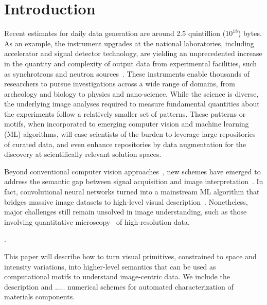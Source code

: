\section{Introduction}
Recent estimates for daily data generation are around 2.5 quintillion ($10^{18}$) bytes. As an example, the instrument upgrades at the national laboratories, including accelerator and signal detector technology, are yielding an unprecedented increase in the quantity and complexity of output data from experimental facilities, such as synchrotrons and neutron sources~\cite{EOD:2015}. These instruments enable thousands of researchers to pursue investigations across a wide range of domains, from archeology and biology to physics and nano-science. While the science is diverse, the underlying image analyses required to measure fundamental quantities about the experiments follow a relatively smaller set of patterns. These patterns or motifs, when incorporated to emerging computer vision and machine learning (ML) algorithms, will ease scientists of the burden to leverage large repositories of curated data, and even enhance repositories by data augmentation for the discovery at scientifically relevant solution spaces.

Beyond conventional computer vision approaches~\cite{Ballard, Gonzalez, AFM:2015}, new schemes have emerged to address the semantic gap between signal acquisition and image interpretation~\cite{Zhang:2016:a}. In fact, convolutional neural networks turned into a mainstream ML algorithm that bridges massive image datasets to high-level visual description~\cite{Fei:2009, Fei:2015}. Nonetheless, major challenges still remain unsolved in image understanding, such as those involving quantitative microscopy~\cite{Ushizima2016} of high-resolution data.

.

This paper will describe how to turn visual primitives, constrained to space and intensity variations, into higher-level semantics that can be used as computational motifs to understand image-centric data. We include the description and ..... 
numerical schemes for automated characterization of materials components.

